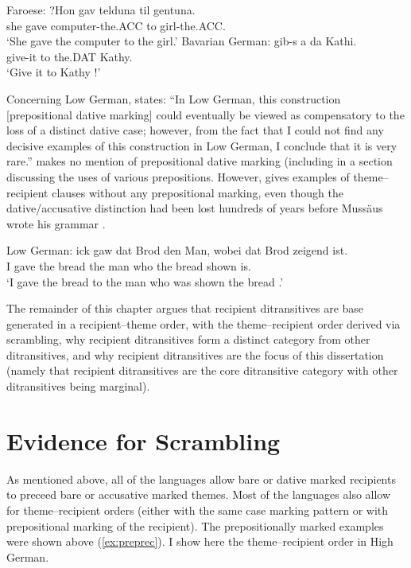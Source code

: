 \documentclass[11pt]{upenndiss}
\begin{document}
\begin{exe}
	\ex Faroese:
	\gll *?Hon gav telduna til gentuna.\\
	she gave computer-the.ACC to girl-the.ACC.\\
	\trans `She gave the computer to the girl.'
	\ex Bavarian German:
	\gll gib-s a da Kathi.\\
	give-it to the.DAT Kathy.\\
	\trans `Give it to Kathy \citep[pg 95]{Seiler.2003}!'
\end{exe}

Concerning Low German, \cite{Fleischer.2006} states: ``In Low German, this construction [prepositional dative marking] could eventually be viewed as compensatory to the loss of a distinct dative case; however, from the fact that I could not find any decisive examples of this construction in Low German, I conclude that it is very rare.'' \cite{Lindow.1998} makes no mention of prepositional dative marking (including in a section discussing the uses of various prepositions. However, \cite{Mussaus.1829} gives examples of theme--recipient clauses without any prepositional marking, even though the dative/accusative distinction had been lost hundreds of years before Mussäus wrote his grammar \citep{Lasch.1914,Boden.1993}.

\begin{exe}
	\ex Low German:
	\gll ick gaw dat Brod den Man, wobei dat Brod zeigend ist.\\
	I gave the bread the man who the bread shown is.\\
	\trans `I gave the bread to the man who was shown the bread \citep{Mussaus.1829}.'
\end{exe}

The remainder of this chapter argues that recipient ditransitives are base generated in a recipient--theme order, with the theme--recipient order derived via scrambling, why recipient ditransitives form a distinct category from other ditransitives, and why recipient ditransitives are the focus of this dissertation (namely that recipient ditransitives are the core ditransitive category with other ditransitives being marginal).
\section{Evidence for Scrambling}

As mentioned above, all of the languages allow bare or dative marked recipients to preceed bare or accusative marked themes. Most of the languages also allow for theme--recipient orders (either with the same case marking pattern or with prepositional marking of the recipient). The prepositionally marked examples were shown above (\ref{ex:preprec}). I show here the theme--recipient order in High German.
\end{document}

